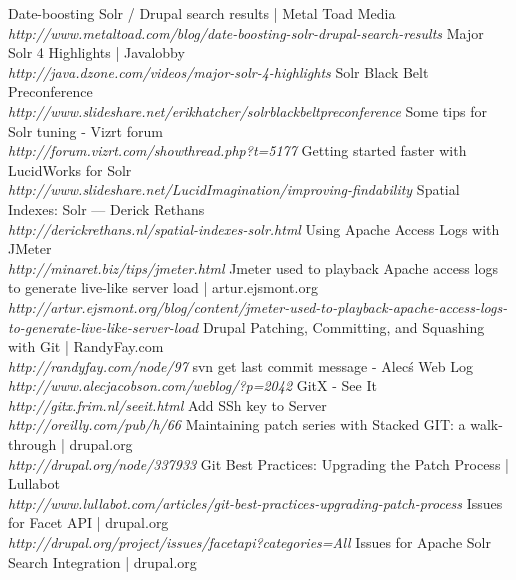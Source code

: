 \begin{thebibliography}{99}
		Date-boosting Solr / Drupal search results | Metal Toad Media\\
		\emph{http://www.metaltoad.com/blog/date-boosting-solr-drupal-search-results}
		Major Solr 4 Highlights | Javalobby\\
		\emph{http://java.dzone.com/videos/major-solr-4-highlights}
		Solr Black Belt Pre\-conference \\
		\emph{http://www.slideshare.net/erikhatcher/solr\-black\-belt\-preconference}
		Some tips for Solr tuning - Vizrt forum\\
		\emph{http://forum.vizrt.com/showthread.php?t=5177}
		Getting started faster with LucidWorks for Solr \\
		\emph{http://www.slideshare.net/LucidImagination/improving-findability}
		Spatial Indexes: Solr — Derick Rethans \\
		\emph{http://derickrethans.nl/spatial-indexes-solr.html}
		Using Apache Access Logs with JMeter \\
		\emph{http://minaret.biz/tips/jmeter.html}
		Jmeter used to playback Apache access logs to generate live-like server load | artur.ejsmont.org \\
		\emph{http://artur.ejsmont.org/blog/content/jmeter-used-to-playback-apache-access-logs-to-generate-live-like-server-load}
		Drupal Patching, Committing, and Squashing with Git | RandyFay.com\\
		\emph{http://randyfay.com/node/97}
		svn get last commit message - Alec\'s Web Log \\
		\emph{http://www.alecjacobson.com/weblog/?p=2042}
		GitX - See It \\
		\emph{http://gitx.frim.nl/seeit.html}
		Add SSh key to Server \\
		\emph{http://oreilly.com/pub/h/66}
		Maintaining patch series with Stacked GIT: a walk-through | drupal.org \\
		\emph{http://drupal.org/node/337933}
		Git Best Practices: Upgrading the Patch Process | Lullabot \\
		\emph{http://www.lullabot.com/articles/git-best-practices-upgrading-patch-process}
		Issues for Facet API | drupal.org\\
		\emph{http://drupal.org/project/issues/facetapi?categories=All}
		Issues for Apache Solr Search Integration | drupal.org\\

\end{thebibliography}
